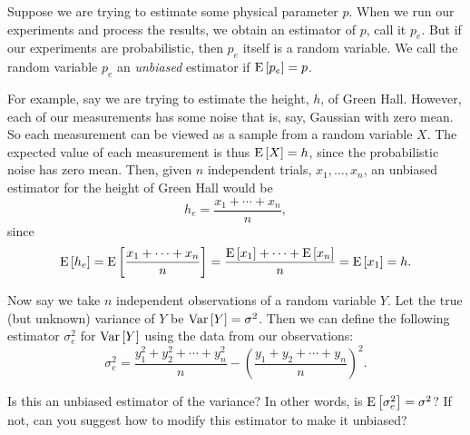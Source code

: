 \documentclass[12pt,twoside]{article}
\begin{document}
\begin{problem}{14}
Suppose we are trying to estimate some physical parameter $p$.  When
we run our experiments and process the results, we obtain an estimator
of $p$, call it $p_e$.  But if our experiments are probabilistic, then
$p_e$ itself is a random variable.
We call the random variable $p_e$
an \emph{unbiased} estimator if $\mathop{\textup{E}}\nolimits\left[p_e\right]=p$.

For example, say we are trying to estimate the height, $h$, of Green
Hall.  However, each of our measurements has some noise that is, say,
Gaussian with zero mean.  So each measurement can be viewed as a
sample from a random variable $X$.  The expected value of each
measurement is thus $\mathop{\textup{E}}\nolimits\left[X\right] = h$, since the probabilistic noise
has zero mean.  Then, given $n$ independent trials, $x_1, \dots, x_n$,
an unbiased estimator for the height of Green Hall would be
\[
h_e = \frac{x_1+\cdots+x_n}{n},
\]
since
\[
\mathop{\textup{E}}\nolimits\left[h_e\right] = \mathop{\textup{E}}\nolimits\left[\frac{x_1+\cdots+x_n}{n}\right]
= \frac{\mathop{\textup{E}}\nolimits\left[x_1\right] + \cdots + \mathop{\textup{E}}\nolimits\left[x_n\right]}{n} = \mathop{\textup{E}}\nolimits\left[x_1\right]= h.
\]

Now say we take $n$ independent observations of a random variable $Y$.
Let the true (but unknown) variance of $Y$ be $\mathop{\textup{Var}}\nolimits\left[Y\right]
= \sigma^2$.  Then
we can define the following estimator $\sigma_e^2$ for $\mathop{\textup{Var}}\nolimits\left[Y\right]$
using the data from our observations:
\[
\sigma_e^2 =  \frac{y_1^2 + y_2^2 + \cdots + y_n^2}{n} -
                \left(\frac{y_1 + y_2 + \cdots + y_n}{n}\right)^2.
\]


Is this an unbiased estimator of the variance?   In
other words, is $\mathop{\textup{E}}\nolimits\left[\sigma_e^2\right] = \sigma^2$?   If not, can you
suggest how to modify this estimator to make it unbiased?


\end{problem}
\end{document}

